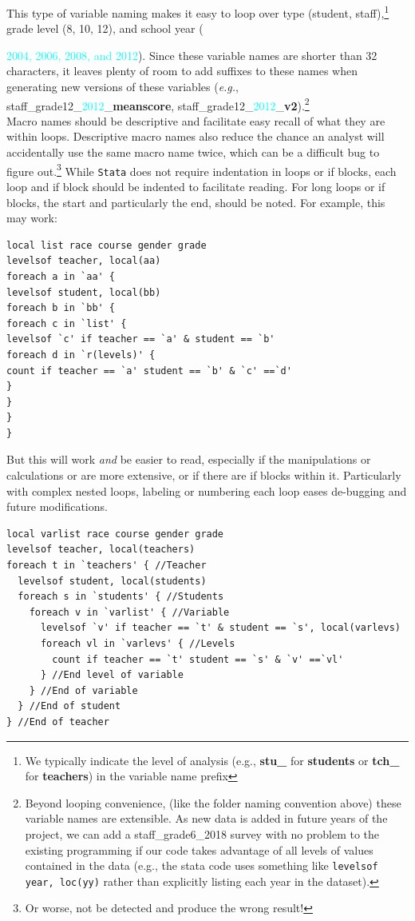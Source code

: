 This type of  variable naming makes it easy to loop over type ({\textcolor{uscred}{student}}, {\textcolor{uscgold}{staff}}),\footnote{We typically indicate the level of analysis (e.g., \textcolor{uscred}{\textbf{stu\_}} for \textcolor{uscred}{\textbf{students}} or \textcolor{uscgold}{\textbf{tch\_}} for \textcolor{uscgold}{\textbf{teachers}}) in the variable name prefix} grade level (8, 10, 12), and school year ({\textcolor{cyan}{2004, 2006, 2008, and 2012}).  Since these variable names are shorter than 32 characters, it leaves plenty of room to add suffixes to these names when generating new versions of these variables (\textit{e.g.}, {\textcolor{uscgold}{\textsf{staff}}}\_grade12\_{\textcolor{cyan}{2012}}\_\textbf{meanscore},  {\textcolor{uscgold}{\textsf{staff}}}\_grade12\_{\textcolor{cyan}{2012}}\_\textbf{v2}).\footnote{Beyond looping convenience, (like the folder naming convention above) these variable names are extensible. As new data is added in future years of the project, we can add a staff\_grade6\_2018 survey with no problem to the existing programming if our code takes advantage of all levels of values contained in the data (e.g., the stata code uses something like \texttt{levelsof year, loc(yy)} rather than explicitly listing each year in the dataset).} \\

Macro names should be descriptive and facilitate easy recall of what they are within loops. Descriptive macro names also reduce the chance an analyst will accidentally use the same macro name twice, which can be a difficult bug to figure out.\footnote{Or worse, not be detected and produce the wrong result!} While \texttt{Stata} does not require indentation in loops or if blocks, each loop and if block should be indented to facilitate reading. For long loops or if blocks, the start and particularly the end, should be noted. For example, this may work:
\begin{lstlisting}
local list race course gender grade
levelsof teacher, local(aa)
foreach a in `aa' {
levelsof student, local(bb)
foreach b in `bb' {
foreach c in `list' {
levelsof `c' if teacher == `a' & student == `b'
foreach d in `r(levels)' {
count if teacher == `a' student == `b' & `c' ==`d'
}
}
}
}
\end{lstlisting}
But this will work \emph{and} be easier to read, especially if the manipulations or calculations or are more extensive, or if there are if blocks within it. Particularly with complex nested loops, labeling or numbering each loop eases de-bugging and future modifications.
\begin{lstlisting}
local varlist race course gender grade
levelsof teacher, local(teachers)
foreach t in `teachers' { //Teacher
  levelsof student, local(students)
  foreach s in `students' { //Students
    foreach v in `varlist' { //Variable
      levelsof `v' if teacher == `t' & student == `s', local(varlevs)
      foreach vl in `varlevs' { //Levels
        count if teacher == `t' student == `s' & `v' ==`vl'
      } //End level of variable
    } //End of variable
  } //End of student
} //End of teacher
\end{lstlisting}

}
